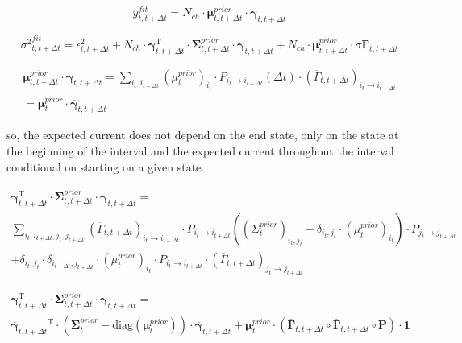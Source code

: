 \documentclass[pdflatex,sn-mathphys-num]{sn-jnl}%
\theoremstyle{thmstyleone}%
\theoremstyle{thmstyletwo}%
\theoremstyle{thmstylethree}%
\begin{document}
\begin{equation}
	y^{fit}_{t,t+\Delta t} = N_{ch} \cdot \mathbf \mu^{prior}_{t,t+\Delta t} \cdot \mathbf \gamma_{t,t+\Delta t}
\end{equation}

\begin{equation}
	{\sigma^2}^{fit}_{t, t+\Delta t}
	= \epsilon^2_{t, t+\Delta t} +N_{ch} \cdot {\mathbf \gamma}^{\mathrm{T}}_{t, t+\Delta t} \cdot \mathbf \Sigma^{prior}_{t, t+\Delta t} \cdot \mathbf \gamma_{t, t+\Delta t}
	+ N_{ch} \cdot \mathbf \mu^{prior}_{t, t+\Delta t} \cdot {\sigma \mathbf  \Gamma}_{t, t+\Delta t}
\end{equation}

\begin{multline}
	\mathbf \mu^{prior}_{t,t+\Delta t} \cdot \mathbf \gamma_{t,t+\Delta t} =
	\sum_{i_t, i_{t+ \Delta t}} {(\mu^{prior}_{t})_{i_t}  \cdot P_{i_t \rightarrow i_{t+ \Delta t}}(\Delta t) \cdot ({\overline \Gamma_{t,t + \Delta t}})_{i_t \rightarrow i_{t+\Delta t}}}\\= \mathbf \mu^{prior}_t \cdot  \overline {\mathbf \gamma}_{t, t+\Delta t}
\end{multline}






so, the expected current does not depend on the end state, only on the state at the beginning of the interval and the expected current throughout the interval conditional on starting on a given state. 

\begin{multline}
	{\mathbf \gamma}^{\mathrm{T}}_{t, t+\Delta t} \cdot \mathbf \Sigma^{prior}_{t, t+\Delta t} \cdot \mathbf \gamma_{t, t+\Delta t}= \\
	\sum_{i_t, i_{t +\Delta t},j_t, j_{t +\Delta t}}
	({\overline \Gamma_{t,t + \Delta t}})_{i_t \rightarrow i_{t+\Delta t}} \cdot 
	P_{i_t \rightarrow i_{t+ \Delta t}} \left((\Sigma^{prior}_{t})_{i_t ,j_t} - \delta_{i_t, j_t} \cdot (\mu^{prior}_t)_{i_t} \right)  \cdot P_{j_t \rightarrow j_{t+ \Delta t}} \\+\delta_{i_t, j_t} \cdot \delta_{i_{t+ \Delta t}, j_{t+ \Delta t}} \cdot (\mu^{prior}_t)_{i_t}\cdot P_{i_t \rightarrow i_{t+ \Delta t}} 
	\cdot 
	({\overline \Gamma_{t,t + \Delta t}})_{j_t \rightarrow j_{t+\Delta t}} 
\end{multline}

\begin{multline}
	{\mathbf \gamma}^{\mathrm{T}}_{t, t+\Delta t} \cdot \mathbf \Sigma^{prior}_{t, t+\Delta t} \cdot \mathbf \gamma_{t, t+\Delta t}= \\
	{\overline {\mathbf \gamma}_{t, t+\Delta t}}^\mathrm{T} \cdot 
	(\mathbf \Sigma^{prior}_{t} -\mathrm{diag}( \mathbf \mu^{prior}_t))\cdot  
	{\overline {\mathbf \gamma}_{t, t+\Delta t}}+ 
	\mathbf \mu^{prior}_t \cdot ( \overline {\mathbf \Gamma}_{t, t + \Delta t}  \circ  \overline {\mathbf \Gamma}_{t, t + \Delta t}  \circ \mathbf P ) \cdot \mathbf 1
\end{multline}
\end{document}
